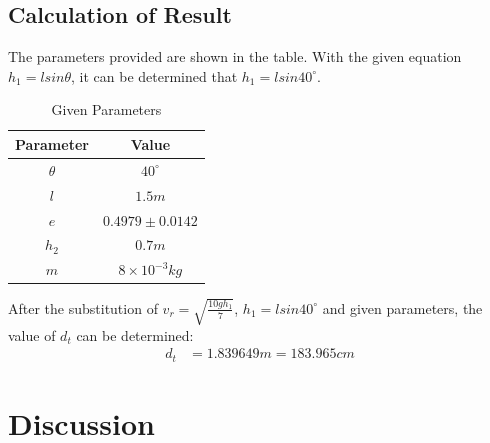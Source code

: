 \documentclass[conference]{IEEEtran}
\begin{document}
        \subsection{Calculation of  Result}
            The parameters provided are shown in the table. With the given equation $h_1 = lsin\theta$, it can be determined that $h_1 = lsin40^\circ$.
            \begin{table}[H]
                \caption {Given Parameters} \label{parameters} 
                \begin{center}
                    \begin{tabular}{cc}
                        \hline
                        Parameter & Value \\
                        \hline
                        $\theta$     & $40^\circ$     \\
                        $l$         & $1.5m$     \\
                        $e$         & $0.4979 \pm 0.0142$     \\
                        $h_2$        & $0.7m$     \\
                        $m$         & $8\times10^{-3}kg$     \\
                        \hline
                    \end{tabular}
                \end{center}
            \end{table}
            After the substitution of  $v_r = \sqrt{\frac{10gh_1}{7}}$, $h_1 = lsin40^\circ$ and given parameters, the value of $d_t$ can be determined:
            \begin{align*}
                d_t &= 1.839649m = 183.965cm
            \end{align*}

       
            
\section{Discussion}
\end{document}
